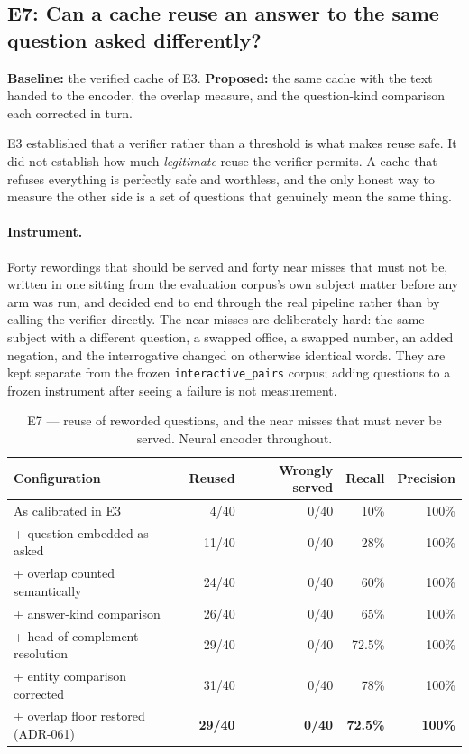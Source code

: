 \documentclass[11pt,a4paper]{article}
\begin{document}

\subsection{E7: Can a cache reuse an answer to the same question asked differently?}
\label{sec:e7}

\textbf{Baseline:} the verified cache of E3. \textbf{Proposed:} the same cache
with the text handed to the encoder, the overlap measure, and the question-kind
comparison each corrected in turn.

E3 established that a verifier rather than a threshold is what makes reuse safe.
It did not establish how much \emph{legitimate} reuse the verifier permits. A
cache that refuses everything is perfectly safe and worthless, and the only
honest way to measure the other side is a set of questions that genuinely mean
the same thing.

\paragraph{Instrument.} Forty rewordings that should be served and forty near
misses that must not be, written in one sitting from the evaluation corpus's own
subject matter before any arm was run, and decided end to end through the real
pipeline rather than by calling the verifier directly. The near misses are
deliberately hard: the same subject with a different question, a swapped office,
a swapped number, an added negation, and the interrogative changed on otherwise
identical words. They are kept separate from the frozen
\texttt{interactive\_pairs} corpus;  adding questions to a
frozen instrument after seeing a failure is not measurement.

\begin{table}[htbp]
\centering
\caption{E7 --- reuse of reworded questions, and the near misses that must never
be served. Neural encoder throughout.}
\label{tab:reuse-recall}
\footnotesize
\begin{tabular}{@{}l r r r r@{}}
\toprule
\textbf{Configuration} & \textbf{Reused} & \textbf{Wrongly served} &
\textbf{Recall} & \textbf{Precision} \\
\midrule
As calibrated in E3                      & 4/40  & 0/40 & 10\% & 100\% \\
\;+ question embedded as asked           & 11/40 & 0/40 & 28\% & 100\% \\
\;+ overlap counted semantically         & 24/40 & 0/40 & 60\% & 100\% \\
\;+ answer-kind comparison               & 26/40 & 0/40 & 65\% & 100\% \\
\;+ head-of-complement resolution        & 29/40 & 0/40 & 72.5\% & 100\% \\
\;+ entity comparison corrected          & 31/40 & 0/40 & 78\% & 100\% \\
\;+ overlap floor restored (ADR-061)     & \textbf{29/40} & \textbf{0/40} &
\textbf{72.5\%} & \textbf{100\%} \\
\bottomrule
\end{tabular}
\end{table}
\end{document}
